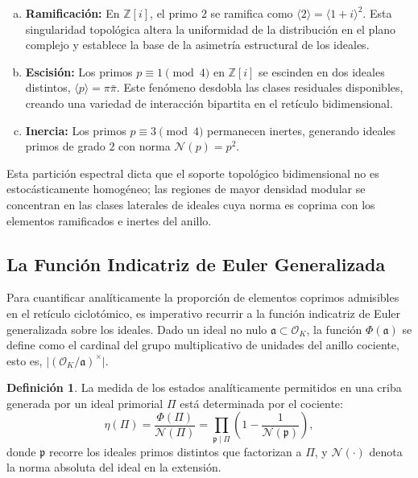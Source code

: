 \documentclass{article}
\numberwithin{equation}{section}
\theoremstyle{plain}
\theoremstyle{definition}
\newtheorem{definicion}[teorema]{Definición}
\begin{document}
\begin{enumerate}[(a)]
    \item \textbf{Ramificación:} En $\mathbb{Z}[i]$, el primo $2$ se ramifica como $\langle 2 \rangle = \langle 1+i \rangle^2$. Esta singularidad topológica altera la uniformidad de la distribución en el plano complejo y establece la base de la asimetría estructural de los ideales.
    \item \textbf{Escisión:} Los primos $p \equiv 1 \pmod 4$ en $\mathbb{Z}[i]$ se escinden en dos ideales distintos, $\langle p \rangle = \pi \bar{\pi}$. Este fenómeno desdobla las clases residuales disponibles, creando una variedad de interacción bipartita en el retículo bidimensional.
    \item \textbf{Inercia:} Los primos $p \equiv 3 \pmod 4$ permanecen inertes, generando ideales primos de grado $2$ con norma $\mathcal{N}(p) = p^2$.
\end{enumerate}

Esta partición espectral dicta que el soporte topológico bidimensional no es estocásticamente homogéneo; las regiones de mayor densidad modular se concentran en las clases laterales de ideales cuya norma es coprima con los elementos ramificados e inertes del anillo.

\subsection{La Función Indicatriz de Euler Generalizada}

Para cuantificar analíticamente la proporción de elementos coprimos admisibles en el retículo ciclotómico, es imperativo recurrir a la función indicatriz de Euler generalizada sobre los ideales. Dado un ideal no nulo $\mathfrak{a} \subset \mathcal{O}_K$, la función $\Phi(\mathfrak{a})$ se define como el cardinal del grupo multiplicativo de unidades del anillo cociente, esto es, $\lvert(\mathcal{O}_K/\mathfrak{a})^\times\rvert$.

\begin{definicion}
La medida de los estados analíticamente permitidos en una criba generada por un ideal primorial $\Pi$ está determinada por el cociente:
\begin{equation}
    \eta(\Pi) = \frac{\Phi(\Pi)}{\mathcal{N}(\Pi)} = \prod_{\mathfrak{p} \mid \Pi} \left( 1 - \frac{1}{\mathcal{N}(\mathfrak{p})} \right),
\end{equation}
donde $\mathfrak{p}$ recorre los ideales primos distintos que factorizan a $\Pi$, y $\mathcal{N}(\cdot)$ denota la norma absoluta del ideal en la extensión.
\end{definicion}
\end{document}
